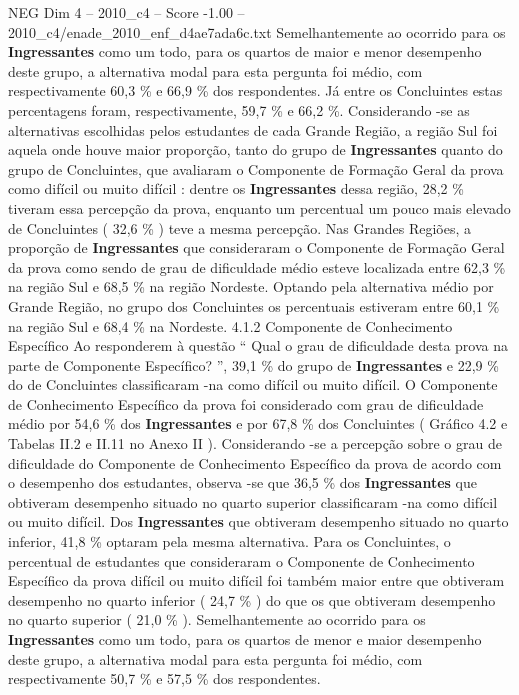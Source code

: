 \begin{textsample}{NEG Dim 4 – 2010\_c4 – Score -1.00 – 2010\_c4/enade\_2010\_enf\_d4ae7ada6c.txt}
Semelhantemente ao ocorrido para os \textbf{Ingressantes} como um todo, para os quartos de maior e menor desempenho deste grupo, a alternativa modal para esta pergunta foi médio, com respectivamente 60,3 \% e 66,9 \% dos respondentes.
Já entre os Concluintes estas percentagens foram, respectivamente, 59,7 \% e 66,2 \%.
Considerando -se as alternativas escolhidas pelos estudantes de cada Grande Região, a região Sul foi aquela onde houve maior proporção, tanto do grupo de \textbf{Ingressantes} quanto do grupo de Concluintes, que avaliaram o Componente de Formação Geral da prova como difícil ou muito difícil : dentre os \textbf{Ingressantes} dessa região, 28,2 \% tiveram essa percepção da prova, enquanto um percentual um pouco mais elevado de Concluintes ( 32,6 \% ) teve a mesma percepção.
Nas Grandes Regiões, a proporção de \textbf{Ingressantes} que consideraram o Componente de Formação Geral da prova como sendo de grau de dificuldade médio esteve localizada entre 62,3 \% na região Sul e 68,5 \% na região Nordeste.
Optando pela alternativa médio por Grande Região, no grupo dos Concluintes os percentuais estiveram entre 60,1 \% na região Sul e 68,4 \% na Nordeste. 4.1.2 Componente de Conhecimento Específico Ao responderem à questão “ Qual o grau de dificuldade desta prova na parte de Componente Específico? ”, 39,1 \% do grupo de \textbf{Ingressantes} e 22,9 \% do de Concluintes classificaram -na como difícil ou muito difícil.
O Componente de Conhecimento Específico da prova foi considerado com grau de dificuldade médio por 54,6 \% dos \textbf{Ingressantes} e por 67,8 \% dos Concluintes ( Gráfico 4.2 e Tabelas II.2 e II.11 no Anexo II ).
Considerando -se a percepção sobre o grau de dificuldade do Componente de Conhecimento Específico da prova de acordo com o desempenho dos estudantes, observa -se que 36,5 \% dos \textbf{Ingressantes} que obtiveram desempenho situado no quarto superior classificaram -na como difícil ou muito difícil.
Dos \textbf{Ingressantes} que obtiveram desempenho situado no quarto inferior, 41,8 \% optaram pela mesma alternativa.
Para os Concluintes, o percentual de estudantes que consideraram o Componente de Conhecimento Específico da prova difícil ou muito difícil foi também maior entre que obtiveram desempenho no quarto inferior ( 24,7 \% ) do que os que obtiveram desempenho no quarto superior ( 21,0 \% ).
Semelhantemente ao ocorrido para os \textbf{Ingressantes} como um todo, para os quartos de menor e maior desempenho deste grupo, a alternativa modal para esta pergunta foi médio, com respectivamente 50,7 \% e 57,5 \% dos respondentes.

\end{textsample}
